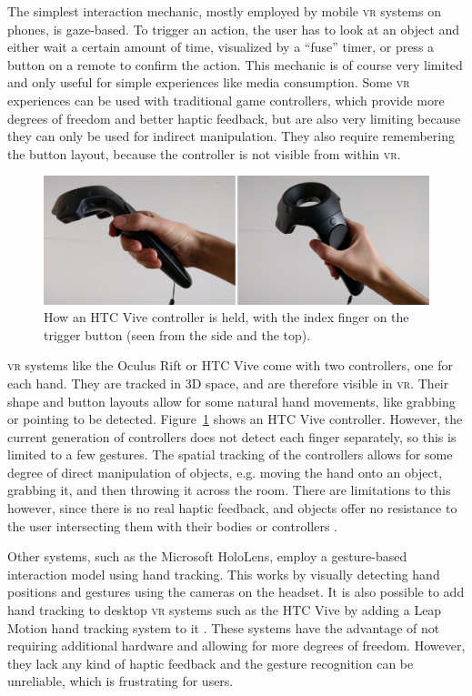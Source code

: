\documentclass[nobib]{tufte-book} %
\begin{document}
The simplest interaction mechanic, mostly employed by mobile \textsc{vr} systems on phones, is gaze-based. To trigger an action, the user has to look at an object and either wait a certain amount of time, visualized by a ``fuse'' timer, or press a button on a remote to confirm the action. This mechanic is of course very limited and only useful for simple experiences like media consumption. Some \textsc{vr} experiences can be used with traditional game controllers, which provide more degrees of freedom and better haptic feedback, but are also very limiting because they can only be used for indirect manipulation. They also require remembering the button layout, because the controller is not visible from within \textsc{vr}.

\begin{figure}
  \includegraphics{vive-controller.png}
  \caption{How an HTC Vive controller is held, with the index finger on the trigger button (seen from the side and the top).}
  \label{fig:vive-controller}
\end{figure}

\textsc{vr} systems like the Oculus Rift or HTC Vive come with two controllers, one for each hand. They are tracked in 3D space, and are therefore visible in \textsc{vr}. Their shape and button layouts allow for some natural hand movements, like grabbing or pointing to be detected. Figure~\ref{fig:vive-controller} shows an HTC Vive controller. However, the current generation of controllers does not detect each finger separately, so this is limited to a few gestures. The spatial tracking of the controllers allows for some degree of direct manipulation of objects, e.g. moving the hand onto an object, grabbing it, and then throwing it across the room. There are limitations to this however, since there is no real haptic feedback, and objects offer no resistance to the user intersecting them with their bodies or controllers \cite{sanchez2005presence}.

Other systems, such as the Microsoft HoloLens, employ a gesture-based interaction model using hand tracking. This works by visually detecting hand positions and gestures using the cameras on the headset. It is also possible to add hand tracking to desktop \textsc{vr} systems such as the HTC Vive by adding a Leap Motion hand tracking system to it \cite[-1cm]{wozniak2016possible}. These systems have the advantage of not requiring additional hardware and allowing for more degrees of freedom. However, they lack any kind of haptic feedback and the gesture recognition can be unreliable, which is frustrating for users.
\end{document}
